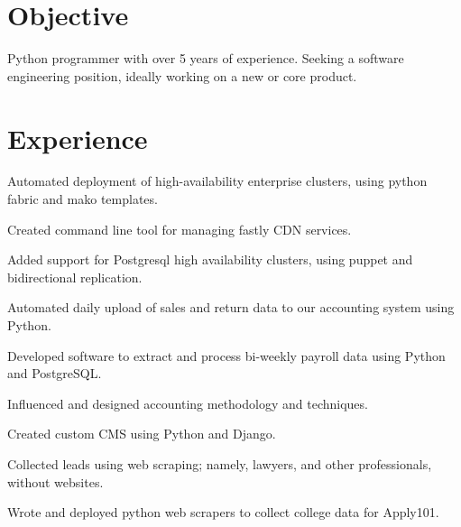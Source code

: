 \documentclass[]{deemweaver}
\begin{document}
\begin{minipage}[t]{0.66\textwidth} 

\section{Objective}
Python programmer with over 5 years of experience. Seeking a software engineering position, ideally working on a new or core product.

\section{Experience}
\begin{tightemize}
\vspace{\topsep} %
\item Automated deployment of high-availability enterprise clusters, using python fabric and mako templates.
\item Created command line tool for managing fastly CDN services.
\item Added support for Postgresql high availability clusters, using puppet and bidirectional replication.
\end{tightemize}
\sectionsep


\begin{tightemize}
\vspace{\topsep} %
\item Automated daily upload of sales and return data to our accounting system using Python.
\item Developed software to extract and process bi-weekly payroll data using Python and PostgreSQL.
\item Influenced and designed accounting methodology and techniques.
\end{tightemize}
\sectionsep

\begin{tightemize}
\item Created custom CMS using Python and Django.
\item Collected leads using web scraping; namely, lawyers, and other professionals, without websites.
\item Wrote and deployed python web scrapers to collect college data for Apply101.
\end{tightemize}
\sectionsep


\end{minipage}
\end{document}
